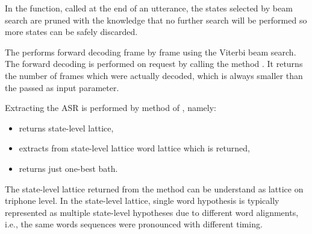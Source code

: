 In the  function, called at the end of an utterance, the states selected by beam search are pruned with the knowledge that no further search will be performed so more states can be safely discarded.

The  performs forward decoding frame by frame using the Viterbi beam search.
The forward decoding is performed on request by calling the method .
It returns the number of frames which were actually decoded, which is always smaller than the  passed as input parameter.


Extracting the \ac{ASR} is performed by method of , namely:
\begin{itemize}
    \item {} returns state-level lattice,
    \item {} extracts from state-level lattice word lattice which is returned,
    \item {} returns just one-best bath.
\end{itemize}

The state-level lattice returned from the  method can be understand as lattice on triphone level.
In the state-level lattice, single word hypothesis is typically represented as multiple state-level hypotheses due to different word alignments, i.e., the same words sequences were pronounced with different timing.



